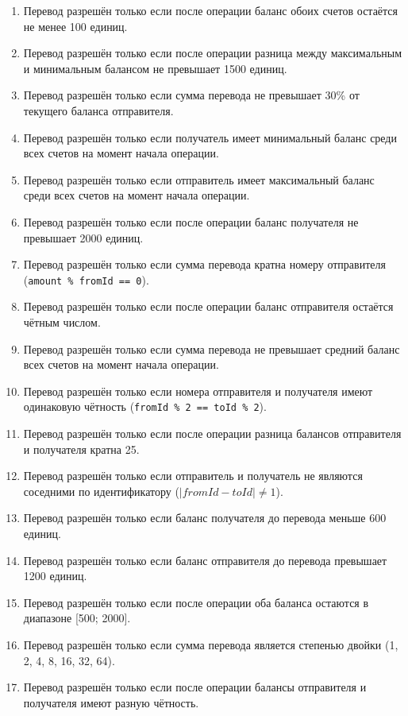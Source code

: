 \documentclass[12pt]{article}
\begin{document}
\begin{enumerate}
    \item Перевод разрешён только если после операции баланс обоих счетов остаётся не менее 100 единиц.
    \item Перевод разрешён только если после операции разница между максимальным и минимальным балансом не превышает 1500 единиц.
    \item Перевод разрешён только если сумма перевода не превышает 30\% от текущего баланса отправителя.
    \item Перевод разрешён только если получатель имеет минимальный баланс среди всех счетов на момент начала операции.
    \item Перевод разрешён только если отправитель имеет максимальный баланс среди всех счетов на момент начала операции.
    \item Перевод разрешён только если после операции баланс получателя не превышает 2000 единиц.
    \item Перевод разрешён только если сумма перевода кратна номеру отправителя (\texttt{amount \% fromId == 0}).
    \item Перевод разрешён только если после операции баланс отправителя остаётся чётным числом.
    \item Перевод разрешён только если сумма перевода не превышает средний баланс всех счетов на момент начала операции.
    \item Перевод разрешён только если номера отправителя и получателя имеют одинаковую чётность (\texttt{fromId \% 2 == toId \% 2}).
    \item Перевод разрешён только если после операции разница балансов отправителя и получателя кратна 25.
    \item Перевод разрешён только если отправитель и получатель не являются соседними по идентификатору ($|fromId - toId| \neq 1$).
    \item Перевод разрешён только если баланс получателя до перевода меньше 600 единиц.
    \item Перевод разрешён только если баланс отправителя до перевода превышает 1200 единиц.
    \item Перевод разрешён только если после операции оба баланса остаются в диапазоне [500; 2000].
    \item Перевод разрешён только если сумма перевода является степенью двойки (1, 2, 4, 8, 16, 32, 64).
    \item Перевод разрешён только если после операции балансы отправителя и получателя имеют разную чётность.

\end{enumerate}
\end{document}
